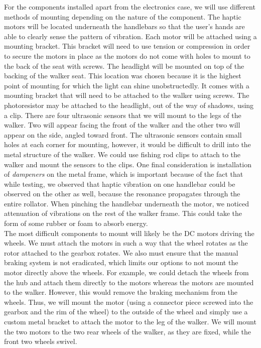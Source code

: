 \noindent For the components installed apart from the electronics case, we will use different methods of mounting depending on the nature of the component. The haptic motors will be located underneath the handlebars so that the user's hands are able to clearly sense the pattern of vibration. Each motor will be attached using a mounting bracket. This bracket will need to use tension or compression in order to secure the motors in place as the motors do not come with holes to mount to the back of the seat with screws. The headlight will be mounted on top of the backing of the walker seat. This location was chosen because it is the highest point of mounting for which the light can shine unobstructedly. It comes with a mounting bracket that will need to be attached to the walker using screws. The photoresistor may be attached to the headlight, out of the way of shadows, using a clip. There are four ultrasonic sensors that we will mount to the legs of the walker. Two will appear facing the front of the walker and the other two will appear on the side, angled toward front. The ultrasonic sensors contain small holes at each corner for mounting, however, it would be difficult to drill into the metal structure of the walker. We could use fishing rod clips to attach to the walker and mount the sensors to the clips. One final consideration is installation of \textit{dampeners} on the metal frame, which is important because of the fact that while testing, we observed that haptic vibration on one handlebar could be observed on the other as well, because the resonance propagates through the entire rollator. When pinching the handlebar underneath the motor, we noticed attenuation of vibrations on the rest of the walker frame. This could take the form of some rubber or foam to absorb energy.\\

\noindent The most difficult components to mount will likely be the DC motors driving the wheels. We must attach the motors in such a way that the wheel rotates as the rotor attached to the gearbox rotates. We also must ensure that the manual braking system is not eradicated, which limits our options to not mount the motor directly above the wheels. For example, we could detach the wheels from the hub and attach them directly to the motors whereas the motors are mounted to the walker. However, this would remove the braking mechanism from the wheels. Thus, we will mount the motor (using a connector piece screwed into the gearbox and the rim of the wheel) to the outside of the wheel and simply use a custom metal bracket to attach the motor to the leg of the walker. We will mount the two motors to the two rear wheels of the walker, as they are fixed, while the front two wheels swivel.\\ 

